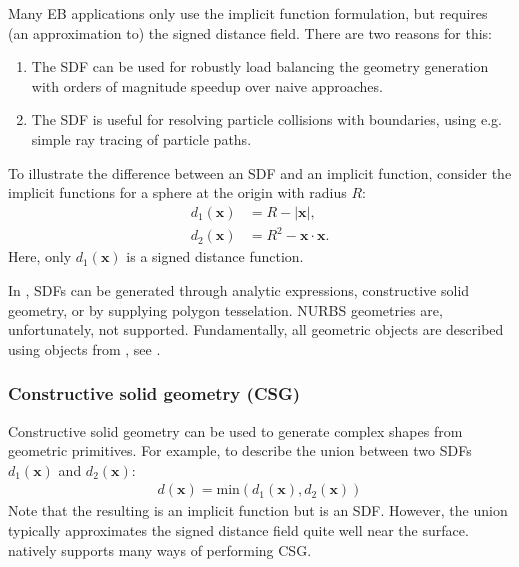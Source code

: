 \documentclass[letterpaper,10pt,english]{sphinxmanual}
\begin{document}
Many EB applications only use the implicit function formulation, but  requires (an approximation to) the signed distance field.
There are two reasons for this:
\begin{enumerate}
%
\item {} 
The SDF can be used for robustly load balancing the geometry generation with orders of magnitude speedup over naive approaches.

\item {} 
The SDF is useful for resolving particle collisions with boundaries, using e.g. simple ray tracing of particle paths.

\end{enumerate}

To illustrate the difference between an SDF and an implicit function, consider the implicit functions for a sphere at the origin with radius \(R\):
\begin{align}
d_1\left(\mathbf{x}\right) &= R - \left|\mathbf{x}\right|, \\
d_2\left(\mathbf{x}\right) &= R^2 - \mathbf{x}\cdot\mathbf{x}.
\end{align}
Here, only \(d_1\left(\mathbf{x}\right)\) is a signed distance function.

In , SDFs can be generated through analytic expressions, constructive solid geometry, or by supplying polygon tesselation.
NURBS geometries are, unfortunately, not supported.
Fundamentally, all geometric objects are described using  objects from , see {\hyperref[\detokenize{Source/ChomboBasics:chap-baseif}]{}}.


\subsubsection{Constructive solid geometry (CSG)}
\label{\detokenize{Source/SpatialDiscretization:constructive-solid-geometry-csg}}
Constructive solid geometry can be used to generate complex shapes from geometric primitives.
For example, to describe the union between two SDFs \(d_1\left(\mathbf{x}\right)\) and \(d_2\left(\mathbf{x}\right)\):
\begin{equation*}
\begin{split}d\left(\mathbf{x}\right) = \textrm{min}\left(d_1\left(\mathbf{x}\right), d_2\left(\mathbf{x}\right)\right)\end{split}
\end{equation*}
Note that the resulting is an implicit function but is  an SDF.
However, the union typically approximates the signed distance field quite well near the surface.
 natively supports many ways of performing CSG.
\end{document}
